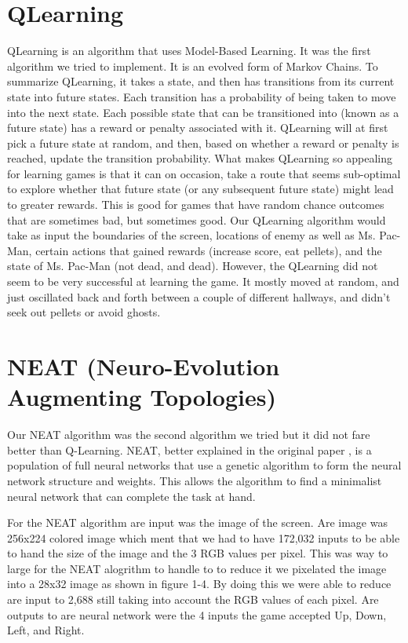 \documentclass[12pt,journal,compsoc]{IEEEtran}
\begin{document}
\section{QLearning}
QLearning is an algorithm that uses Model-Based Learning. It was the first algorithm we tried to implement. It is an evolved form of Markov Chains. To summarize QLearning, it takes a state, and then has transitions from its current state into future states. Each transition has a probability of being taken to move into the next state. Each possible state that can be transitioned into (known as a future state) has a reward or penalty associated with it. QLearning will at first pick a future state at random, and then, based on whether a reward or penalty is reached, update the transition probability. What makes QLearning so appealing for learning games is that it can on occasion, take a route that seems sub-optimal to explore whether that future state (or any subsequent future state) might lead to greater rewards. This is good for games that have random chance outcomes that are sometimes bad, but sometimes good.
Our QLearning algorithm would take as input the boundaries of the screen, locations of enemy as well as Ms. Pac-Man, certain actions that gained rewards (increase score, eat pellets), and the state of Ms. Pac-Man (not dead, and dead). However, the QLearning did not seem to be very successful at learning the game. It mostly moved at random, and just oscillated back and forth between a couple of different hallways, and didn’t seek out pellets or avoid ghosts.

\section{NEAT (Neuro-Evolution Augmenting Topologies)}
Our NEAT algorithm was the second algorithm we tried but it did not fare better than Q-Learning. NEAT, better explained in the original paper \cite{8}, is a population of full neural networks that use a genetic algorithm to form the neural network structure and weights. This allows the algorithm to find a minimalist neural network that can complete the task at hand. 

For the NEAT algorithm are input was the image of the screen. Are image was 256x224 colored image which ment that we had to have 172,032 inputs to be able to hand the size of the image and the 3 RGB values per pixel. This was way to large for the NEAT alogrithm to handle to to reduce it we pixelated the image into a 28x32 image as shown in figure 1-4. By doing this we were able to reduce are input to 2,688 still taking into account the RGB values of each pixel. Are outputs to are neural network were the 4 inputs the game accepted Up, Down, Left, and Right.
\end{document}

